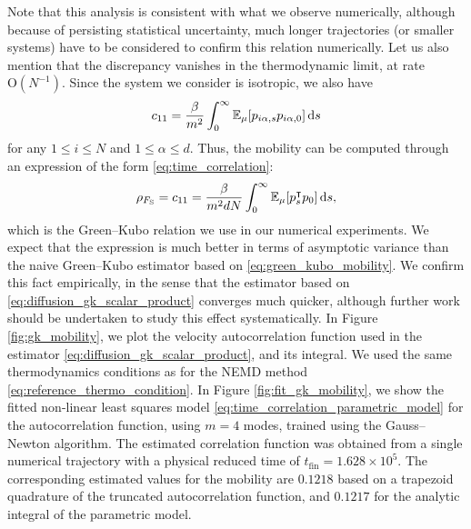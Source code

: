 Note that this analysis is consistent with what we observe numerically, although because of persisting statistical uncertainty, much longer trajectories (or smaller systems) have to be considered to confirm this relation numerically.
Let us also mention that the discrepancy vanishes in the thermodynamic limit, at rate $\mathrm{O}(N^{-1})$.
Since the system we consider is isotropic, we also have 
\[c_{11}=\frac{\beta}{m^2}\int_0^\infty\mathbb{E}_\mu[p_{i\alpha,s}p_{i\alpha,0}]\,\mathrm{d} s\]
for any $1\leq i\leq N$ and $1\leq \alpha\leq d$. Thus, the mobility can be computed through an expression of the form \eqref{eq:time_correlation}:
\begin{equation}
    \label{eq:diffusion_gk_scalar_product}
    \rho_{F_{\mathrm{S}}}=c_{11}=\frac{\beta}{m^2 d N}\int_{0}^\infty \mathbb{E}_\mu[p_s^\intercal p_0]\,\mathrm{d} s,
\end{equation}
which is the Green--Kubo relation we use in our numerical experiments.
We expect that the expression \label{eq:diffusion_gk_scalar_product} is much better in terms of asymptotic variance than the naive Green--Kubo estimator based on \eqref{eq:green_kubo_mobility}.
We confirm this fact empirically, in the sense that the estimator based on \eqref{eq:diffusion_gk_scalar_product} converges much quicker, although further work should be undertaken to study this effect systematically.
In Figure \ref{fig:gk_mobility}, we plot the velocity autocorrelation function used in the estimator \eqref{eq:diffusion_gk_scalar_product}, and its integral. 
We used the same thermodynamics conditions as for the NEMD method \eqref{eq:reference_thermo_condition}. 
In Figure \ref{fig:fit_gk_mobility}, we show the fitted non-linear least squares model \eqref{eq:time_correlation_parametric_model} for the autocorrelation function, using $m=4$ modes, trained using the Gauss--Newton algorithm.
The estimated correlation function was obtained from a single numerical trajectory with a physical reduced time of $t_{\mathrm{fin}}=1.628 \times 10^5$.
The corresponding estimated values for the mobility are $0.1218$ based on a trapezoid quadrature of the truncated autocorrelation function, and $0.1217$ for the analytic integral of the parametric model.


